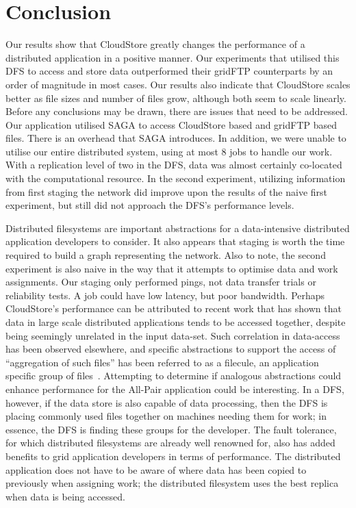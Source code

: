\documentclass{rspublic}
\begin{document}
\section{Conclusion} Our results show that CloudStore greatly changes the
performance of a distributed application in a positive manner. Our
experiments that utilised this DFS to access and store data outperformed
their gridFTP counterparts by an order of magnitude in most cases. Our
results also indicate that CloudStore scales better as file sizes and
number of files grow, although both seem to scale linearly. Before any
conclusions may be drawn, there are issues that need to be addressed.
Our application utilised SAGA to access CloudStore based and gridFTP based
files. There is an overhead that SAGA introduces. In addition, we were
unable to utilise our entire distributed system, using at most 8 jobs to
handle our work. With a replication level of two in the DFS, data was
almost certainly co-located with the computational resource. In the
second experiment, utilizing information from first staging the network
did improve upon the results of the naive first experiment, but still
did not approach the DFS's performance levels.

Distributed filesystems are important abstractions for a data-intensive
distributed application developers to consider. It also appears that
staging is worth the time required to build a graph representing the
network. Also to note, the second experiment is also naive in the way
that it attempts to optimise data and work assignments. Our staging
only performed pings, not data transfer trials or reliability tests. A
job could have low latency, but poor bandwidth. Perhaps CloudStore's
performance can be attributed to recent work that has shown that data in
large scale distributed applications tends to be accessed together,
despite being seemingly unrelated in the input data-set. Such
correlation in data-access has been observed elsewhere, and specific
abstractions to support the access of ``aggregation of such files'' has
been referred to as a filecule, an application specific group of
files~\cite{filecule}. Attempting to determine if analogous
abstractions could enhance performance for the All-Pair application
could be interesting. In a DFS, however, if the data store is also
capable of data processing, then the DFS is placing commonly used files
together on machines needing them for work; in essence, the DFS is
finding these groups for the developer. The fault tolerance, for which
distributed filesystems are already well renowned for, also has added
benefits to grid application developers in terms of performance. The
distributed application does not have to be aware of where data has been
copied to previously when assigning work; the distributed filesystem
uses the best replica when data is being accessed.
\end{document}
